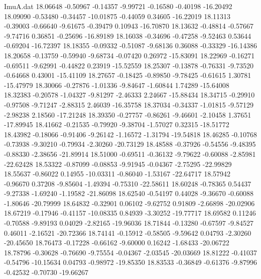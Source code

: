 \begin{filecontents}{ImuA.dat}
  18.06648   -0.50967   -0.14357   -9.99721   -0.16580   -0.40198  -16.20492
  18.09090   -0.53480   -0.34457  -10.01875   -0.44059    0.34605  -16.22019
  18.11313   -0.39003   -0.66640   -9.61675   -0.39479    0.10943  -16.70870
  18.13632   -0.48814   -0.57667   -9.74716    0.36851   -0.25696  -16.89189
  18.16038   -0.34696   -0.47258   -9.52463    0.53644   -0.69204  -16.72397
  18.18355   -0.09332   -0.51087   -9.68136    0.36088   -0.33329  -16.14386
  18.20658   -0.13759   -0.59940   -9.68734   -0.07420    0.26972  -15.83091
  18.22969   -0.16271   -0.69511   -9.62991   -0.44822    0.23919  -15.52559
  18.25307   -0.13878   -0.76331   -9.73520   -0.64668    0.43001  -15.41109
  18.27657   -0.18425   -0.89850   -9.78425   -0.61615    1.30781  -15.47979
  18.30066   -0.27876   -1.01336   -9.84647   -1.60844    1.74289  -15.64008
  18.32383   -0.20578   -1.04327   -9.81297   -2.46333    2.24667  -15.88434
  18.34715   -0.29910   -0.97508   -9.71247   -2.88315    2.46039  -16.35758
  18.37034   -0.34337   -1.01815   -9.57129   -2.98238    2.18560  -17.21248
  18.39350   -0.27757   -0.86261   -9.46601   -2.10458    1.37651  -17.89945
  18.41662   -0.21535   -0.79920   -9.38704   -1.57027    0.32315  -18.51772
  18.43982   -0.18066   -0.91406   -9.26142   -1.16572   -1.31794  -19.54818
  18.46285   -0.10768   -0.73938   -9.30210   -0.79934   -2.30260  -20.73129
  18.48588   -0.37926   -0.54556   -9.48395   -0.88330   -2.38656  -21.89914
  18.51000   -0.69511   -0.36132   -9.79622   -0.60088   -2.85981  -22.62428
  18.53322   -0.87099   -0.08853   -9.91945   -0.04367   -2.75295  -22.99829
  18.55637   -0.86022    0.14955  -10.03311   -0.86040   -1.53167  -22.64717
  18.57942   -0.96670    0.37208   -9.85604   -1.49394   -0.75310  -22.58611
  18.60248   -0.78365    0.54437   -9.27338   -1.69240   -1.19582  -21.86098
  18.62540   -0.54197    0.44028   -9.36670   -0.60088   -1.80646  -20.79999
  18.64832   -0.32901    0.06102   -9.62752    0.91809   -2.66898  -20.02906
  18.67219   -0.17946   -0.41157  -10.08335    0.84939   -3.30252  -19.77717
  18.69582    0.11246   -0.70588   -9.89193    0.04029   -2.82165  -19.96036
  18.71844   -0.13280   -0.67597   -9.84527    0.46011   -2.16521  -20.72366
  18.74141   -0.15912   -0.58505   -9.59642    0.04793   -2.30260  -20.45650
  18.76473   -0.17228   -0.66162   -9.60000    0.16242   -1.68433  -20.06722
  18.78796   -0.30628   -0.76690   -9.75554   -0.04367   -2.03545  -20.03669
  18.81222   -0.41037   -0.54796  -10.15634    0.04793   -0.98972  -19.85350
  18.83533   -0.36849   -0.61376   -9.87996   -0.42532   -0.70730  -19.66267

\end{filecontents}

